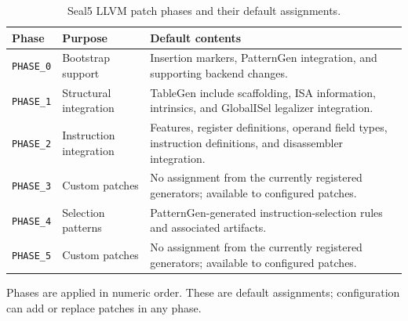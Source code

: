 \begin{table}[tbp]
  \centering
  \small
  \caption{Seal5 LLVM patch phases and their default assignments.}
  \label{tab:seal5-patch-phases}
  \begin{tabularx}{\linewidth}{@{}l l >{\raggedright\arraybackslash}X@{}}
    \toprule
    \textbf{Phase} & \textbf{Purpose} & \textbf{Default contents} \\
    \midrule
    \texttt{PHASE\_0} & Bootstrap support &
      Insertion markers, PatternGen integration, and supporting backend changes. \\
    \addlinespace
    \texttt{PHASE\_1} & Structural integration &
      TableGen include scaffolding, ISA information, intrinsics, and GlobalISel legalizer integration. \\
    \addlinespace
    \texttt{PHASE\_2} & Instruction integration &
      Features, register definitions, operand field types, instruction definitions, and disassembler integration. \\
    \addlinespace
    \texttt{PHASE\_3} & Custom patches &
      No assignment from the currently registered generators; available to configured patches. \\
    \addlinespace
    \texttt{PHASE\_4} & Selection patterns &
      PatternGen-generated instruction-selection rules and associated artifacts. \\
    \addlinespace
    \texttt{PHASE\_5} & Custom patches &
      No assignment from the currently registered generators; available to configured patches. \\
    \bottomrule
  \end{tabularx}
  \par\smallskip
  {\footnotesize\raggedright
    Phases are applied in numeric order. These are default assignments;
    configuration can add or replace patches in any phase.\par}
\end{table}
